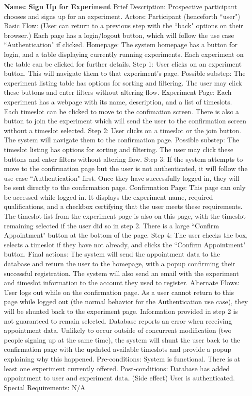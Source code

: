 \begin{outline}[enumerate]
\1 {\bf Name: Sign Up for Experiment}
\2 Brief Description: Prospective participant chooses and signs up for an experiment.
\2 Actors: Participant (henceforth ``user")
\2 Basic Flow: (User can return to a previous step with the ``back" options on their browser.)  Each page has a login/logout button, which will follow the use case ``Authentication" if clicked.
\3 Homepage: The system homepage has a button for login, and a table displaying currently running experiments.  Each experiment on the table can be clicked for further details.
\3 Step 1: User clicks on an experiment button.  This will navigate them to that experiment's page.
\4 Possible substep: The experiment listing table has options for sorting and filtering.  The user may click these buttons and enter filters without altering flow.
\3 Experiment Page: Each experiment has a webpage with its name, description, and a list of timeslots.  Each timeslot can be clicked to move to the confimation screen.  There is also a button to join the experiment which will send the user to the confirmation screen without a timeslot selected.
\3 Step 2: User clicks on a timeslot or the join button.  The system will navigate them to the confirmation page.
\4 Possible substep: The timeslot listing has options for sorting and filtering.  The user may click these buttons and enter filters without altering flow.
\3 Step 3: If the system attempts to move to the confirmation page but the user is not authenticated, it will follow the use case ``Authentication" first.  Once they have successfully logged in, they will be sent directly to the confirmation page.
\3 Confirmation Page: This page can only be accessed while logged in.  It displays the experiment name, required qualifications, and a checkbox certifying that the user meets these requirements.  The timeslot list from the experiment page is also on this page, with the timeslot remaining selected if the user did so in step 2.  There is a large ``Confirm Appointment" button at the bottom of the page.
\3 Step 4: The user checks the box, selects a timeslot if they have not already, and clicks the ``Confirm Appointment" button.
\3 Final actions: The system will send the appointment data to the database and return the user to the homepage, with a popup confirming their successful registration.  The system will also send an email with the experiment and timeslot information to the account they used to register.
\2 Alternate Flows:
\3 User logs out while on the confirmation page.
\4 As a user cannot return to this page while logged out (the normal behavior for the Authentication use case), they will be shunted back to the experiment page.  Information provided in step 2 is not guaranteed to remain selected.
\3 Database reports an error when receiving appointment data.
\4 Unlikely to occur outside of concurrent modification (two people signing up at the same time), the system will shunt the user back to the confirmation page with the updated available timeslots and provide a popup explaining why this happened.
\2 Pre-conditions:
\3 System is functional.
\3 There is at least one experiment currently offered.
\2 Post-conditions:
\3 Database has added appointment to user and experiment data.
\3 (Side effect) User is authenticated.
\2 Special Requirements:
\3 N/A


\end{outline}
